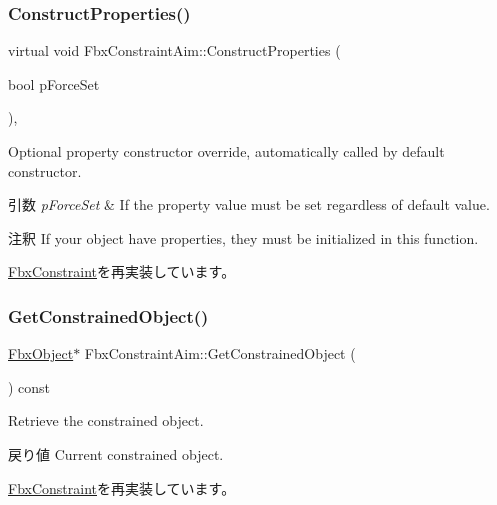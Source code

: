 \subsubsection{\texorpdfstring{Construct\+Properties()}{ConstructProperties()}}
{\footnotesize\ttfamily virtual void Fbx\+Constraint\+Aim\+::\+Construct\+Properties (\begin{DoxyParamCaption}\item[{bool}]{p\+Force\+Set }\end{DoxyParamCaption})\hspace{0.3cm}{\ttfamily [protected]}, {\ttfamily [virtual]}}

Optional property constructor override, automatically called by default constructor. 
\begin{DoxyParams}{引数}
{\em p\+Force\+Set} & If the property value must be set regardless of default value. \\
\hline
\end{DoxyParams}
\begin{DoxyRemark}{注釈}
If your object have properties, they must be initialized in this function. 
\end{DoxyRemark}


\hyperlink{class_fbx_constraint_a0470a25b813b337d07a03ce4b97b44f8}{Fbx\+Constraint}を再実装しています。

\mbox{\label{class_fbx_constraint_aim_a7245132b757540df762f9b37dae533cf}} 
\subsubsection{\texorpdfstring{Get\+Constrained\+Object()}{GetConstrainedObject()}}
{\footnotesize\ttfamily \hyperlink{class_fbx_object}{Fbx\+Object}$\ast$ Fbx\+Constraint\+Aim\+::\+Get\+Constrained\+Object (\begin{DoxyParamCaption}{ }\end{DoxyParamCaption}) const\hspace{0.3cm}{\ttfamily [virtual]}}

Retrieve the constrained object. \begin{DoxyReturn}{戻り値}
Current constrained object. 
\end{DoxyReturn}


\hyperlink{class_fbx_constraint_a7f587d5db9685b5ee925a85354263edc}{Fbx\+Constraint}を再実装しています。

